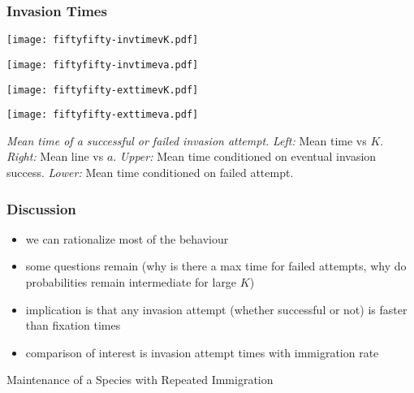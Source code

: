 \documentclass[dvipsnames]{beamer}
\begin{document}
\begin{frame}
\frametitle{Invasion Times}
\centering
\begin{minipage}[b]{0.475\textwidth}
\centering
\texttt{[image: fiftyfifty-invtimevK.pdf]}
\end{minipage}
\hfill
\begin{minipage}[b]{0.475\textwidth}  
\centering 
\texttt{[image: fiftyfifty-invtimeva.pdf]}
\end{minipage}
\begin{minipage}[b]{0.475\textwidth}   
\centering 
\texttt{[image: fiftyfifty-exttimevK.pdf]}
\end{minipage}
\quad
\begin{minipage}[b]{0.475\textwidth}   
\centering
\texttt{[image: fiftyfifty-exttimeva.pdf]}
\end{minipage}
\justifying
\tiny{
\emph{Mean time of a successful or failed invasion attempt.}
\emph{Left:} Mean time vs $K$. 
\emph{Right:} Mean line vs $a$. 
\emph{Upper:} Mean time conditioned on eventual invasion success. 
\emph{Lower:} Mean time conditioned on failed attempt. 
}
\end{frame}


\begin{frame}
\frametitle{Discussion}
\begin{itemize}
\item we can rationalize most of the behaviour
\item some questions remain (why is there a max time for failed attempts, why do probabilities remain intermediate for large $K$)
\item implication is that any invasion attempt (whether successful or not) is faster than fixation times
\item comparison of interest is invasion attempt times with immigration rate
\end{itemize}
\end{frame}



\begin{frame}
\centering
{{\Huge Maintenance of a Species with Repeated Immigration}}
\end{frame}
\end{document}

